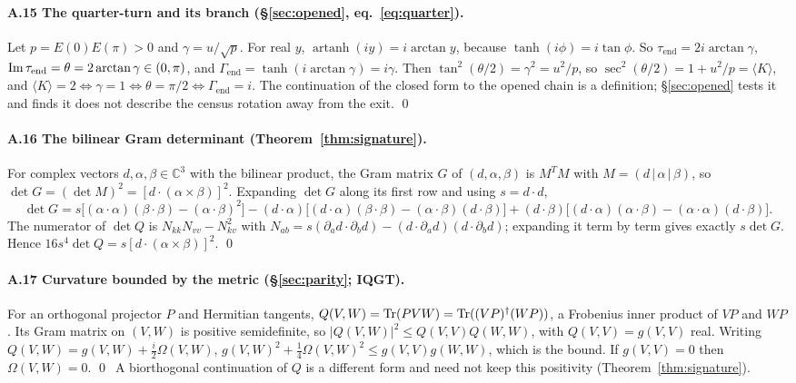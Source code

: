 \paragraph{A.15 The quarter-turn and its branch (§\ref{sec:opened}, eq.~\ref{eq:quarter}).}
Let $p=E(0)E(\pi)>0$ and $\gamma=u/\sqrt p$. For real $y$, $\operatorname{artanh}(iy)=i\arctan y$, because $\tanh(i\phi)=i\tan\phi$. So $\tau_{\mathrm{end}}=2i\arctan\gamma$, $\operatorname{Im}\tau_{\mathrm{end}}=\theta=2\arctan\gamma\in(0,\pi)$, and $\Gamma_{\mathrm{end}}=\tanh(i\arctan\gamma)=i\gamma$. Then $\tan^2(\theta/2)=\gamma^2=u^2/p$, so $\sec^2(\theta/2)=1+u^2/p=\langle K\rangle$, and $\langle K\rangle=2\iff\gamma=1\iff\theta=\pi/2\iff\Gamma_{\mathrm{end}}=i$. The continuation of the closed form to the opened chain is a definition; §\ref{sec:opened} tests it and finds it does not describe the census rotation away from the exit. \qed

\paragraph{A.16 The bilinear Gram determinant (Theorem~\ref{thm:signature}).}
For complex vectors $d,\alpha,\beta\in\mathbb C^3$ with the bilinear product, the Gram matrix $G$ of $(d,\alpha,\beta)$ is $M^TM$ with $M=(d\,|\,\alpha\,|\,\beta)$, so $\det G=(\det M)^2=[d\cdot(\alpha\times\beta)]^2$. Expanding $\det G$ along its first row and using $s=d\cdot d$,
\[
\det G=s\big[(\alpha\cdot\alpha)(\beta\cdot\beta)-(\alpha\cdot\beta)^2\big]-(d\cdot\alpha)\big[(d\cdot\alpha)(\beta\cdot\beta)-(\alpha\cdot\beta)(d\cdot\beta)\big]+(d\cdot\beta)\big[(d\cdot\alpha)(\alpha\cdot\beta)-(\alpha\cdot\alpha)(d\cdot\beta)\big].
\]
The numerator of $\det Q$ is $N_{kk}N_{vv}-N_{kv}^2$ with $N_{ab}=s(\partial_ad\cdot\partial_bd)-(d\cdot\partial_ad)(d\cdot\partial_bd)$; expanding it term by term gives exactly $s\det G$. Hence $16s^4\det Q=s[d\cdot(\alpha\times\beta)]^2$. \qed

\paragraph{A.17 Curvature bounded by the metric (§\ref{sec:parity}; IQGT).}
For an orthogonal projector $P$ and Hermitian tangents, $Q(V,W)=\operatorname{Tr}(PVW)=\operatorname{Tr}((VP)^\dagger(WP))$, a Frobenius inner product of $VP$ and $WP$. Its Gram matrix on $(V,W)$ is positive semidefinite, so $|Q(V,W)|^2\le Q(V,V)Q(W,W)$, with $Q(V,V)=g(V,V)$ real. Writing $Q(V,W)=g(V,W)+\tfrac i2\Omega(V,W)$, $g(V,W)^2+\tfrac14\Omega(V,W)^2\le g(V,V)g(W,W)$, which is the bound. If $g(V,V)=0$ then $\Omega(V,W)=0$. \qed\ A biorthogonal continuation of $Q$ is a different form and need not keep this positivity (Theorem~\ref{thm:signature}).

